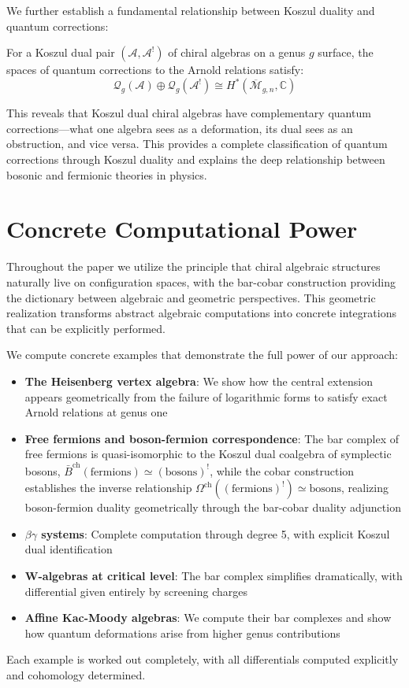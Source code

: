 We further establish a fundamental relationship between Koszul duality and quantum corrections:

\begin{theorem}
For a Koszul dual pair $(\mathcal{A}, \mathcal{A}^!)$ of chiral algebras on a genus $g$ surface, the spaces of quantum corrections to the Arnold relations satisfy:
$$\mathcal{Q}_g(\mathcal{A}) \oplus \mathcal{Q}_g(\mathcal{A}^!) \cong H^*(\overline{\mathcal{M}}_{g,n}, \mathbb{C})$$
\end{theorem}

This reveals that Koszul dual chiral algebras have complementary quantum corrections—what one algebra sees as a deformation, its dual sees as an obstruction, and vice versa. This provides a complete classification of quantum corrections through Koszul duality and explains the deep relationship between bosonic and fermionic theories in physics.



\section{Concrete Computational Power}

Throughout the paper we utilize the principle that chiral algebraic structures naturally live on configuration spaces, with the bar-cobar construction providing the dictionary between algebraic and geometric perspectives. This geometric realization transforms abstract algebraic computations into concrete integrations that can be explicitly performed. 

We compute concrete examples that demonstrate the full power of our approach:
\begin{itemize}
\item \textbf{The Heisenberg vertex algebra}: We show how the central extension appears geometrically from the failure of logarithmic forms to satisfy exact Arnold relations at genus one
\item \textbf{Free fermions and boson-fermion correspondence}: The bar complex of free fermions is quasi-isomorphic to the Koszul dual coalgebra of symplectic bosons, $\bar{B}^{\text{ch}}(\text{fermions}) \simeq (\text{bosons})^!$, while the cobar construction establishes the inverse relationship $\Omega^{\text{ch}}((\text{fermions})^!) \simeq \text{bosons}$, realizing boson-fermion duality geometrically through the bar-cobar duality adjunction
\item \textbf{$\beta\gamma$ systems}: Complete computation through degree 5, with explicit Koszul dual identification
\item \textbf{W-algebras at critical level}: The bar complex simplifies dramatically, with differential given entirely by screening charges
\item \textbf{Affine Kac-Moody algebras}: We compute their bar complexes and show how quantum deformations arise from higher genus contributions
\end{itemize}

Each example is worked out completely, with all differentials computed explicitly and cohomology determined.